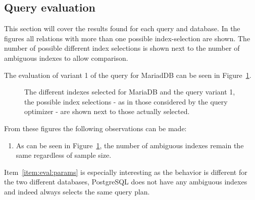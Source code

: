 \subsection{Query evaluation}
This section will cover the results found for each query and database. In the
figures all relations with more than one possible index-selection are shown.
The number of possible different index selections is shown next to the number of
ambiguous indexes to allow comparison.

The evaluation of variant 1 of the query for MariadDB can be seen in
Figure~\ref{fig:plot:mariadb:query1}.

\begin{figure}
\caption[The index selections for MariaDB and query variant 1.]{The different
  indexes selected for MariaDB and the query variant 1, the possible index
  selections - as in those considered by the query optimizer - are shown next to
those actually selected.}
\label{fig:plot:mariadb:query1}
\end{figure}

From these figures the following observations can be made:
\begin{enumerate}
\item\label{item:eval:params} As can be seen in
  Figure~\ref{fig:plot:mariadb:query1}, the number of ambiguous indexes remain
  the same regardless of sample size.
\end{enumerate}

Item~\ref{item:eval:params} is especially interesting as the behavior is
different for the two different databases, PostgreSQL does not have any
ambiguous indexes and indeed always selects the same query plan.